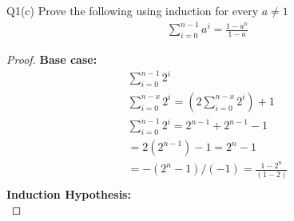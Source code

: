 \begin{problem}
  {Q1(c)}
  Prove the following using induction for every $a \ne 1$ \\
  \begin{align*}
    \sum_{i=0}^{n-1}a^i = \frac{1 - a^n}{1-a}
  \end{align*}
  \begin{proof}
    \textbf{Base case:} \\
    \begin{align*}
    \sum_{i=0}^{n-1}2^i \\
    \sum_{i=0}^{n-x}2^i = (2\sum_{i = 0}^{n-x}2^i) + 1\\
    \sum_{i=0}^{n-1}2^i = 2^{n-1} + 2^{n-1} - 1 \\
    =2(2^{n-1}) - 1 = 2^{n} - 1 \\
    =-(2^{n} - 1) / (-1) = \frac{1 - 2^n}{(1 - 2)} \\
    \end{align*}
    \textbf{Induction Hypothesis:} \\
  \end{proof}
\end{problem}
